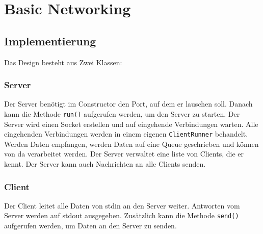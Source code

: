 \chapter{Basic Networking}

\section{Implementierung}
Das Design besteht aus Zwei Klassen:

\subsection{Server}
Der Server benötigt im Constructor den Port, auf dem er lauschen soll.
Danach kann die Methode \texttt{run()} aufgerufen werden, um den Server zu starten.
Der Server wird einen Socket erstellen und auf eingehende Verbindungen warten.
Alle eingehenden Verbindungen werden in einem eigenen \texttt{ClientRunner} behandelt.
Werden Daten empfangen, werden Daten auf eine Queue geschrieben und können von da verarbeitet werden.
Der Server verwaltet eine liste von Clients, die er kennt. Der Server kann auch Nachrichten an alle Clients senden.

\subsection{Client}
Der Client leitet alle Daten von stdin an den Server weiter. Antworten vom Server werden auf stdout ausgegeben.
Zusätzlich kann die Methode \texttt{send()} aufgerufen werden, um Daten an den Server zu senden.

